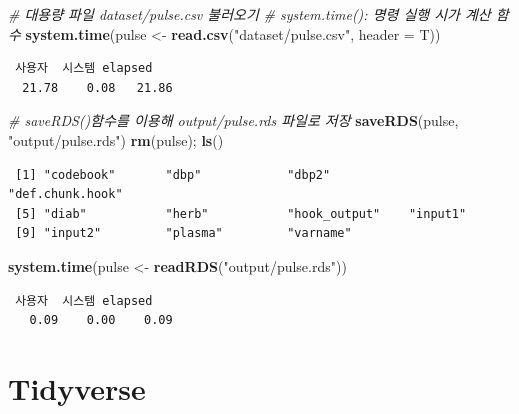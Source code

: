 \documentclass[
  11pt,
]{krantz}
\newenvironment{Shaded}{\begin{snugshade}}{\end{snugshade}}
\newcommand{\CommentTok}[1]{\textcolor[rgb]{0.37,0.37,0.37}{\textit{#1}}}
\newcommand{\DataTypeTok}[1]{\textcolor[rgb]{0.27,0.27,0.27}{#1}}
\newcommand{\KeywordTok}[1]{\textcolor[rgb]{0.27,0.27,0.27}{\textbf{#1}}}
\newcommand{\NormalTok}[1]{#1}
\newcommand{\StringTok}[1]{\textcolor[rgb]{0.5,0.5,0.5}{#1}}
\begin{document}
\footnotesize

\begin{Shaded}
\begin{Highlighting}[]
\CommentTok{# 대용량 파일 dataset/pulse.csv 불러오기}
\CommentTok{# system.time(): 명령 실행 시가 계산 함수}
\KeywordTok{system.time}\NormalTok{(pulse <-}\StringTok{ }\KeywordTok{read.csv}\NormalTok{(}\StringTok{"dataset/pulse.csv"}\NormalTok{, }\DataTypeTok{header =}\NormalTok{ T))}
\end{Highlighting}
\end{Shaded}

\begin{verbatim}
 사용자  시스템 elapsed 
  21.78    0.08   21.86 
\end{verbatim}

\begin{Shaded}
\begin{Highlighting}[]
\CommentTok{# saveRDS()함수를 이용해 output/pulse.rds 파일로 저장}
\KeywordTok{saveRDS}\NormalTok{(pulse, }\StringTok{"output/pulse.rds"}\NormalTok{)}
\KeywordTok{rm}\NormalTok{(pulse); }\KeywordTok{ls}\NormalTok{()}
\end{Highlighting}
\end{Shaded}

\begin{verbatim}
 [1] "codebook"       "dbp"            "dbp2"           "def.chunk.hook"
 [5] "diab"           "herb"           "hook_output"    "input1"        
 [9] "input2"         "plasma"         "varname"       
\end{verbatim}

\begin{Shaded}
\begin{Highlighting}[]
\KeywordTok{system.time}\NormalTok{(pulse <-}\StringTok{ }\KeywordTok{readRDS}\NormalTok{(}\StringTok{"output/pulse.rds"}\NormalTok{))}
\end{Highlighting}
\end{Shaded}

\begin{verbatim}
 사용자  시스템 elapsed 
   0.09    0.00    0.09 
\end{verbatim}

\normalsize

\hypertarget{tidyverse}{%
\section{Tidyverse}\label{tidyverse}}
\end{document}
